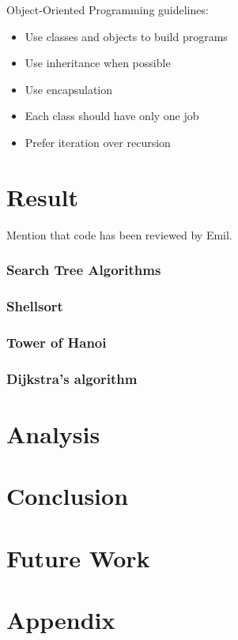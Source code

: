 \documentclass {article}
\begin{document}
Object-Oriented Programming guidelines:
\begin{itemize}
\item Use classes and objects to build programs
\item Use inheritance when possible
\item Use encapsulation
\item Each class should have only one job
\item Prefer iteration over recursion
\end{itemize}

\section{Result}
Mention that code has been reviewed by Emil.
\subsubsection{Search Tree Algorithms}
\subsubsection{Shellsort}
\subsubsection{Tower of Hanoi}
\subsubsection{Dijkstra's algorithm}
\section{Analysis}
\section{Conclusion}
\section{Future Work}


\appendix
\section{Appendix}
\label{appendix:test-cases}
\end{document}
